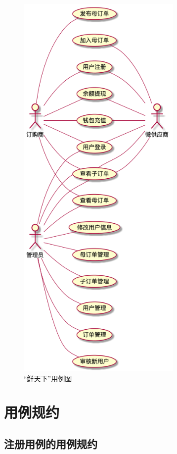 \begin{figure}[htp]
    \centering
    \includegraphics[width=8cm]{report/figure/usecase/uc_main_ver4.png}
    \caption{“鲜天下”用例图}
    \label{fig:usecase-main}
\end{figure}


\section{用例规约}

\subsection{注册用例的用例规约}

